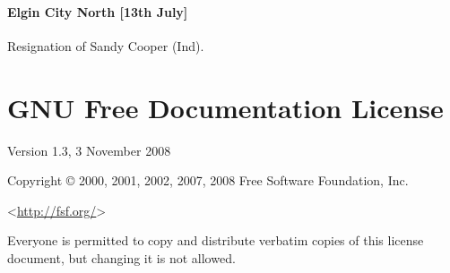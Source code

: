 \documentclass[a4paper,openany]{book}
\begin{document}
\begin{resultsiii}
\subsubsection*{Elgin City North \hspace*{\fill}\nolinebreak[1]%
\enspace\hspace*{\fill}
[13th July]}


Resignation of Sandy Cooper (Ind).

\end{resultsiii}

\clearpage
{}
{\scriptsize%
\frenchspacing\printindex}
\thispagestyle{plain}

\chapter*{{GNU Free Documentation License}}
\pagestyle{plain}

 Version 1.3, 3 November 2008


 Copyright \copyright{} 2000, 2001, 2002, 2007, 2008 Free Software Foundation, Inc.
 
 \bigskip
 
 <\url{http://fsf.org/}>
 
 \bigskip
 
 Everyone is permitted to copy and distribute verbatim copies
 of this license document, but changing it is not allowed.
\end{document}

